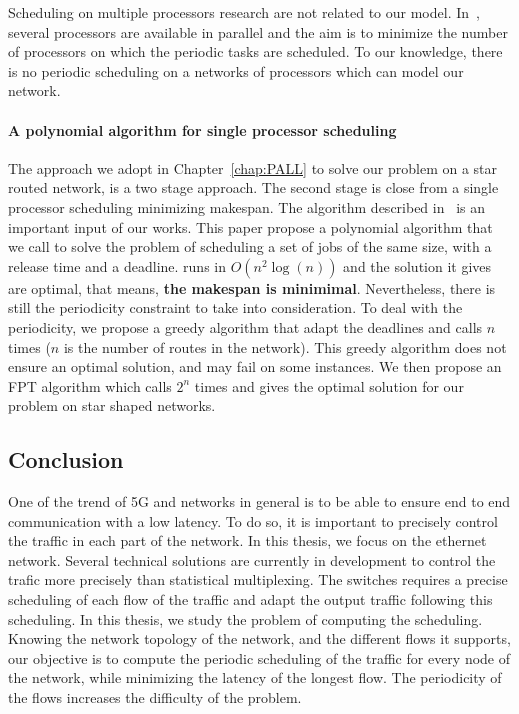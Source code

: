 Scheduling on multiple processors research are not related to our model. In~\cite{korst1991periodic,hanen1993cyclic,aupy2017periodic}, several processors are available in parallel and the aim is to minimize the number of processors on which the periodic tasks are scheduled. To our knowledge, there is no periodic scheduling on a networks of processors which can model our network. 


\paragraph{A polynomial algorithm for single processor scheduling}
The approach we adopt in Chapter~\ref{chap:PALL} to solve our problem on a star routed network, is a two stage approach. The second stage is close from a single processor scheduling minimizing makespan.
The algorithm described in~\cite{simons1978fast} is an important input of our works. This paper propose a polynomial algorithm that we call \MLS to solve the problem of scheduling a set of jobs of the same size, with a release time and a deadline. \MLS runs in $O(n^2\log(n))$ and the solution it gives are optimal, that means, \textbf{the makespan is minimimal}. Nevertheless, there is still the periodicity constraint to take into consideration. To deal with the periodicity, we propose a greedy algorithm that adapt the deadlines and calls \MLS $n$ times ($n$ is the number of routes in the network). This greedy algorithm does not ensure an optimal solution, and may fail on some instances. We then propose an FPT algorithm which calls \MLS $2^n$ times and gives the optimal solution for our problem on star shaped networks.


\subsection{Conclusion}
One of the trend of 5G and networks in general is to be able to ensure end to end communication with a low latency. To do so, it is important to precisely control the traffic in each part of the network. In this thesis, we focus on the ethernet network. Several technical solutions are currently in development to control the trafic more precisely than statistical multiplexing. The switches requires a precise scheduling of each flow of the traffic and adapt the output traffic following this scheduling. 
In this thesis, we study the problem of computing the scheduling. Knowing the network topology of the network, and the different flows it supports, our objective is to compute the periodic scheduling of the traffic for every node of the network, while minimizing the latency of the longest flow. The periodicity of the flows increases the difficulty of the problem.



